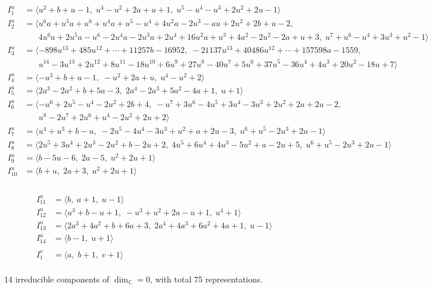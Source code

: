 \documentclass[1p]{elsarticle_modified}
\theoremstyle{definition}
\begin{document}
\begin{align*}
I^u_{1}&=\langle 
u^2+b+u-1,\;u^4- u^2+2 a+u+1,\;u^5- u^4- u^3+2 u^2+2 u-1\rangle \\
I^u_{2}&=\langle 
u^6 a+u^5 a+u^6+u^4 a+u^5- u^4+4 u^2 a-2 u^3- a u+2 u^2+2 b+u-2,\\
\phantom{I^u_{2}}&\phantom{= \langle  }4 u^6 a+2 u^5 a- u^6-2 u^4 a-2 u^3 a+2 u^4+16 u^2 a+u^3+4 a^2-2 u^2-2 a+u+3,\;u^7+u^6- u^4+3 u^3+u^2-1\rangle \\
I^u_{3}&=\langle 
-898 u^{13}+485 u^{12}+\cdots+11257 b-16952,\;-21137 u^{13}+40486 u^{12}+\cdots+157598 a-1559,\\
\phantom{I^u_{3}}&\phantom{= \langle  }u^{14}-3 u^{13}+2 u^{12}+8 u^{11}-18 u^{10}+6 u^9+27 u^8-40 u^7+5 u^6+37 u^5-36 u^4+4 u^3+20 u^2-18 u+7\rangle \\
I^u_{4}&=\langle 
- u^3+b+u-1,\;- u^2+2 a+u,\;u^4- u^2+2\rangle \\
I^u_{5}&=\langle 
2 a^3-2 a^2+b+5 a-3,\;2 a^4-2 a^3+5 a^2-4 a+1,\;u+1\rangle \\
I^u_{6}&=\langle 
- u^6+2 u^5- u^4-2 u^2+2 b+4,\;- u^7+3 u^6-4 u^5+3 u^4-3 u^3+2 u^2+2 a+2 u-2,\\
\phantom{I^u_{6}}&\phantom{= \langle  }u^8-2 u^7+2 u^6+u^4-2 u^2+2 u+2\rangle \\
I^u_{7}&=\langle 
u^4+u^3+b- u,\;-2 u^5-4 u^4-3 u^3+u^2+a+2 u-3,\;u^6+u^5-2 u^3+2 u-1\rangle \\
I^u_{8}&=\langle 
2 u^5+3 u^4+2 u^3-2 u^2+b-2 u+2,\;4 u^5+6 u^4+4 u^3-5 u^2+a-2 u+5,\;u^6+u^5-2 u^3+2 u-1\rangle \\
I^u_{9}&=\langle 
b-5 u-6,\;2 a-5,\;u^2+2 u+1\rangle \\
I^u_{10}&=\langle 
b+u,\;2 a+3,\;u^2+2 u+1\rangle \\
\end{align*}\\
\begin{align*}
I^u_{11}&=\langle 
b,\;a+1,\;u-1\rangle \\
I^u_{12}&=\langle 
u^3+b- u+1,\;- u^3+u^2+2 a- u+1,\;u^4+1\rangle \\
I^u_{13}&=\langle 
2 a^3+4 a^2+b+6 a+3,\;2 a^4+4 a^3+6 a^2+4 a+1,\;u-1\rangle \\
I^u_{14}&=\langle 
b-1,\;u+1\rangle \\
\\
I^v_{1}&=\langle 
a,\;b+1,\;v+1\rangle \\
\end{align*}
\raggedright * 14 irreducible components of $\dim_{\mathbb{C}}=0$, with total 75 representations.\\
\end{document}

